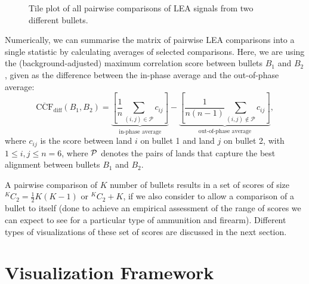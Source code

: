 \documentclass[
  12pt]{article}
\begin{document}
\begin{figure}


\caption{\label{fig-land-matrix}Tile plot of all pairwise comparisons of
LEA signals from two different bullets.}

\end{figure}%

Numerically, we can summarise the matrix of pairwise LEA comparisons
into a single statistic by calculating averages of selected comparisons.
Here, we are using the (background-adjusted) maximum correlation score
\citep{juOpenSourceImplementationCMPS2022} between bullets \(B_1\) and
\(B_2\), given as the difference between the in-phase average and the
out-of-phase average: \[
\mathrm{\overline{CCF}_{diff}}(B_1, B_2) = \underbrace{\left[  \frac{1}{n} \sum_{(i,j) \in \mathcal{P}} c_{ij}\right]}_{\text{in-phase average}} - \underbrace{\left[  \frac{1}{n(n-1)} \sum_{(i,j) \notin \mathcal{P}} c_{ij}\right]}_{\text{out-of-phase average}},
\] where \(c_{ij}\) is the score between land \(i\) on bullet 1 and land
\(j\) on bullet 2, with \(1 \le i, j \le n=6\), where \({\cal P}\)
denotes the pairs of lands that capture the best alignment between
bullets \(B_1\) and \(B_2\).

A pairwise comparison of \(K\) number of bullets results in a set of
scores of size \(^KC_2 = \frac{1}{2}K(K-1)\) or \(^KC_2 + K\), if we
also consider to allow a comparison of a bullet to itself (done to
achieve an empirical assessment of the range of scores we can expect to
see for a particular type of ammunition and firearm). Different types of
visualizations of these set of scores are discussed in the next section.

\section{Visualization Framework}\label{sec-visuals}
\end{document}
